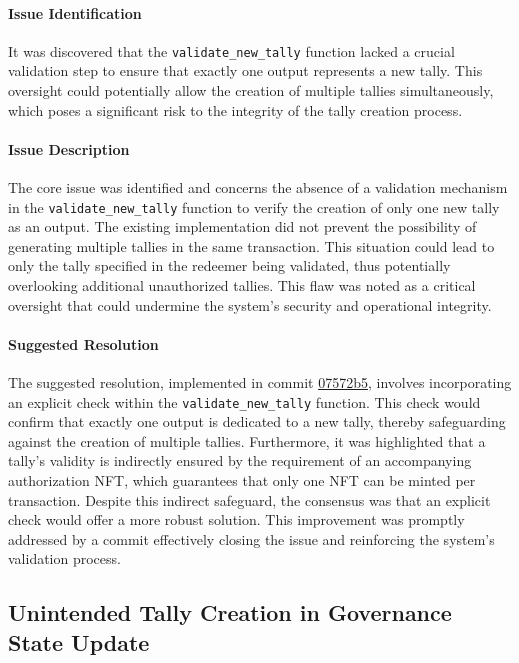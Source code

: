 \documentclass[11pt]{article}
\begin{document}
\paragraph{Issue Identification}
It was discovered that the \texttt{validate\_new\_tally} function lacked a crucial validation step to ensure that exactly one output represents a new tally.
This oversight could potentially allow the creation of multiple tallies simultaneously, which poses a significant risk to the integrity of the tally creation process.

\paragraph{Issue Description}
The core issue was identified and concerns the absence of a validation mechanism in the \texttt{validate\_new\_tally} function to verify the creation of only one new tally as an output.
The existing implementation did not prevent the possibility of generating multiple tallies in the same transaction.
This situation could lead to only the tally specified in the redeemer being validated, thus potentially overlooking additional unauthorized tallies.
This flaw was noted as a critical oversight that could undermine the system's security and operational integrity.

\paragraph{Suggested Resolution}
The suggested resolution, implemented in commit \href{https://github.com/MuesliSwapTeam/muesliswap-atala-onchain-governance/commit/07572b5b699092fbff2aa0fb61fc14183e89179d}{07572b5}, involves incorporating an explicit check within the \texttt{validate\_new\_tally} function.
This check would confirm that exactly one output is dedicated to a new tally, thereby safeguarding against the creation of multiple tallies.
Furthermore, it was highlighted that a tally's validity is indirectly ensured by the requirement of an accompanying authorization NFT, which guarantees that only one NFT can be minted per transaction.
Despite this indirect safeguard, the consensus was that an explicit check would offer a more robust solution.
This improvement was promptly addressed by a commit effectively closing the issue and reinforcing the system's validation process.

\subsection{Unintended Tally Creation in Governance State Update}
\end{document}
